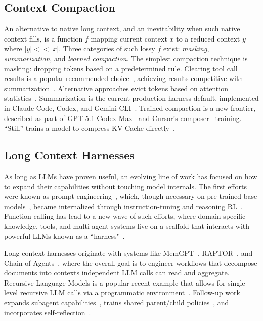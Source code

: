 \documentclass{article} %
\begin{document}
\subsection{Context Compaction}

An alternative to native long context, and an inevitability when such native context fills, is a function $f$ mapping current context $x$ to a reduced context $y$ where $|y| << |x|$. Three categories of such lossy $f$ exist: \emph{masking}, \emph{summarization}, and \emph{learned compaction}. The simplest compaction technique is masking: dropping tokens based on a predetermined rule. Clearing tool call results is a popular recommended choice~\citep{anthropic2025contextengineering}, achieving results competitive with summarization~\citep{deepseekai2025deepseekv32,lindenbauer2025complexitytrap}. Alternative approaches evict tokens based on attention statistics~\citep{xiao2023streamingllm,zhang2023h2o,li2024snapkv}. Summarization is the current production harness default, implemented in Claude Code, Codex, and Gemini CLI~\citep{anthropic2025contextengineering,openai2026codexrepo,google2026geminicli,barbaste2026harnessengineering}. Trained compaction is a new frontier, described as part of GPT-5.1-Codex-Max~\citep{openai2025codexmax} and Cursor's composer~\citep{cursor2026selfsummarization} training. ``Still'' trains a model to compress KV-Cache directly~\citep{oneill2026still}.

\subsection{Long Context Harnesses}

As long as LLMs have proven useful, an evolving line of work has focused on how to expand their capabilities without touching model internals. The first efforts were known as prompt engineering~\citep{phoenix2024promptengineering,berryman2024promptengineering}, which, though necessary on pre-trained base models~\citep{brown2020gpt3}, became internalized through instruction-tuning and reasoning RL~\citep{ouyang2022instructgpt,guo2025deepseekr1}. Function-calling has lead to a new wave of such efforts, where domain-specific knowledge, tools, and multi-agent systems live on a scaffold that interacts with powerful LLMs known as a ``harness"~\citep{lopopolo2026harnessengineering,barbaste2026harnessengineering}. 

Long-context harnesses originate with systems like MemGPT~\citep{packer2023memgpt}, RAPTOR~\citep{sarthi2024raptor}, and Chain of Agents~\citep{zhang2024coa}, where the overall goal is to engineer workflows that decompose documents into contexts independent LLM calls can read and aggregate. Recursive Language Models is a popular recent example that allows for single-level recursive LLM calls via a programmatic environment~\citep{zhang2025rlm}. Follow-up work expands subagent capabilities~\citep{lumer2026rah}, trains shared parent/child policies~\citep{kim2026reinforcingrlm}, and incorporates self-reflection~\citep{alizadeh2026srlm}.
\end{document}
